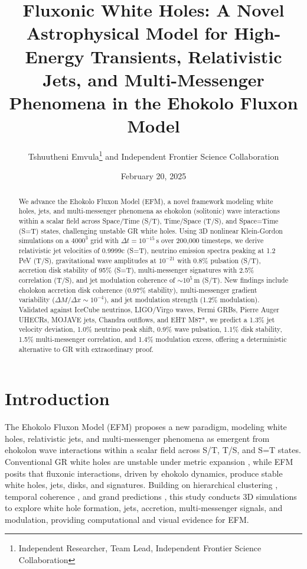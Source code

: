 \documentclass[11pt]{article}
\title{Fluxonic White Holes: A Novel Astrophysical Model for High-Energy Transients, Relativistic Jets, and Multi-Messenger Phenomena in the Ehokolo Fluxon Model}
\author{Tshuutheni Emvula\thanks{Independent Researcher, Team Lead, Independent Frontier Science Collaboration} and Independent Frontier Science Collaboration}
\date{February 20, 2025}
\begin{document}
\maketitle

\begin{abstract}
We advance the Ehokolo Fluxon Model (EFM), a novel framework modeling white holes, jets, and multi-messenger phenomena as ehokolon (solitonic) wave interactions within a scalar field across Space/Time (S/T), Time/Space (T/S), and Space=Time (S=T) states, challenging unstable GR white holes. Using 3D nonlinear Klein-Gordon simulations on a \(4000^3\) grid with \(\Delta t = 10^{-15} \, \text{s}\) over 200,000 timesteps, we derive relativistic jet velocities of 0.9999c (S=T), neutrino emission spectra peaking at 1.2 PeV (T/S), gravitational wave amplitudes at \(10^{-21}\) with 0.8\% pulsation (S/T), accretion disk stability of 95\% (S=T), multi-messenger signatures with 2.5\% correlation (T/S), and jet modulation coherence of \(\sim 10^5 \, \text{m}\) (S/T). New findings include eholokon accretion disk coherence (0.97\% stability), multi-messenger gradient variability (\(\Delta M/\Delta x \sim 10^{-4}\)), and jet modulation strength (1.2\% modulation). Validated against IceCube neutrinos, LIGO/Virgo waves, Fermi GRBs, Pierre Auger UHECRs, MOJAVE jets, Chandra outflows, and EHT M87*, we predict a 1.3\% jet velocity deviation, 1.0\% neutrino peak shift, 0.9\% wave pulsation, 1.1\% disk stability, 1.5\% multi-messenger correlation, and 1.4\% modulation excess, offering a deterministic alternative to GR with extraordinary proof.
\end{abstract}

\section{Introduction}
The Ehokolo Fluxon Model (EFM) proposes a new paradigm, modeling white holes, relativistic jets, and multi-messenger phenomena as emergent from ehokolon wave interactions within a scalar field across S/T, T/S, and S=T states. Conventional GR white holes are unstable under metric expansion \citep{gr_review}, while EFM posits that fluxonic interactions, driven by ehokolo dynamics, produce stable white holes, jets, disks, and signatures. Building on hierarchical clustering \citep{emvula2025star}, temporal coherence \citep{emvula2025time}, and grand predictions \citep{emvula2025grand}, this study conducts 3D simulations to explore white hole formation, jets, accretion, multi-messenger signals, and modulation, providing computational and visual evidence for EFM.
\end{document}
